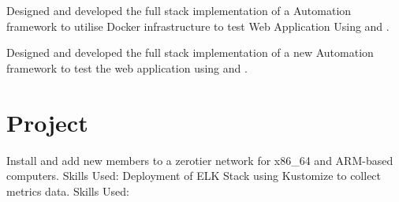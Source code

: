 \documentclass[]{resume}
\begin{document}
\begin{minipage}[t]{0.66\textwidth}
\begin{tightemize}
\item Designed and developed the full stack implementation of a Automation framework to utilise Docker infrastructure to test Web Application Using  and .
\end{tightemize}
\sectionsep
{}
\begin{tightemize}
\item Designed and developed the full stack implementation of a new Automation framework to test the web application using  and .
\end{tightemize}
\sectionsep


\section{Project}
Install and add new members to a zerotier network for x86\_64 and ARM-based computers.
\newline
Skills Used: 
\sectionsep
{}
Deployment of ELK Stack using Kustomize to collect metrics data.
\newline
Skills Used: 
\sectionsep



\end{minipage} 
\end{document}
